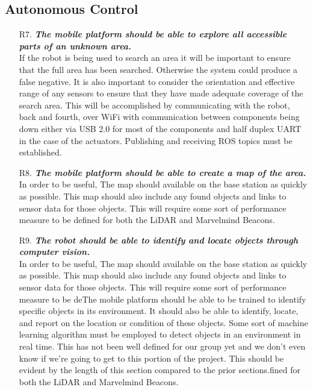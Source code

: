 \documentclass[english,12pt]{article}
\begin{document}
\subsection{Autonomous Control}
\begin{itemize}
    \item[R7.] \textit{\textbf{The mobile platform should be able to explore all accessible parts of an unknown area.}} \\
    If the robot is being used to search an area it will be important to ensure that the full area has been
    searched. Otherwise the system could produce a false negative. It is also important to consider the
    orientation and effective range of any sensors to ensure that they have made adequate coverage of the
    search area. This will be accomplished by communicating with the robot, back and fourth, over WiFi with 
    communication between components being down either via USB 2.0 for most of the components and half duplex UART
    in the case of the actuators. Publishing and receiving ROS topics must be established.
    \item[R8.] \textit{\textbf{The mobile platform should be able to create a map of the area.}} \\
    In order to be useful, The map should available on the base station as quickly as possible. This map
    should also include any found objects and links to sensor data for those objects. This will require some
    sort of performance measure to be defined for both the LiDAR and Marvelmind Beacons.
    \item[R9.] \textit{\textbf{The robot should be able to identify and locate objects through computer vision.}} \\
    In order to be useful, The map should available on the base station as quickly as possible. This map
    should also include any found objects and links to sensor data for those objects. This will require some
    sort of performance measure to be deThe mobile platform should be able to be trained to identify specific objects in its environment. It should
    also be able to identify, locate, and report on the location or condition of these objects. Some sort of
    machine learning algorithm must be employed to detect objects in an environment in real time. This has
    not been well defined for our group yet and we don’t even know if we’re going to get to this portion of
    the project. This should be evident by the length of this section compared to the prior sections.fined for both the LiDAR and Marvelmind Beacons.
\end{itemize}
\end{document}
